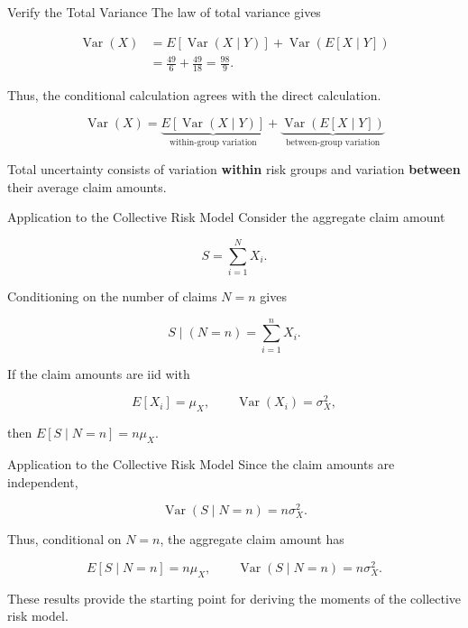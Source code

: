 \documentclass[
  ignorenonframetext,
  aspectratio=169,
]{beamer}
\begin{document}
\begin{frame}{Verify the Total Variance}
\protect{}\label{verify-the-total-variance}
The law of total variance gives

\[
\begin{aligned}
\operatorname{Var}(X)
&=E[\operatorname{Var}(X\mid Y)]
+\operatorname{Var}(E[X\mid Y])\\
&=\frac{49}{6}+\frac{49}{18}=\frac{98}{9}.
\end{aligned}
\]

Thus, the conditional calculation agrees with the direct calculation.

\begin{tcolorbox}[enhanced jigsaw, arc=.35mm, bottomrule=.15mm, bottomtitle=1mm, breakable, colback=white, colbacktitle=quarto-callout-note-color!10!white, colframe=quarto-callout-note-color-frame, coltitle=black, left=2mm, leftrule=.75mm, opacityback=0, opacitybacktitle=0.6, rightrule=.15mm, title=\textcolor{quarto-callout-note-color}{\faInfo}\hspace{0.5em}{Interpretation}, titlerule=0mm, toprule=.15mm, toptitle=1mm]

\[
\boxed{
\operatorname{Var}(X)
=
\underbrace{E[\operatorname{Var}(X\mid Y)]}_{\text{within-group variation}}
+
\underbrace{\operatorname{Var}(E[X\mid Y])}_{\text{between-group variation}}
}
\]

Total uncertainty consists of variation \textbf{within} risk groups and
variation \textbf{between} their average claim amounts.

\end{tcolorbox}
\end{frame}

\begin{frame}{Application to the Collective Risk Model}
\protect{}\label{application-to-the-collective-risk-model}
Consider the aggregate claim amount

\[
S=\sum_{i=1}^{N}X_i.
\]

Conditioning on the number of claims \(N=n\) gives

\[
S\mid(N=n)=\sum_{i=1}^{n}X_i.
\]

If the claim amounts are iid with

\[
E[X_i]=\mu_X,
\qquad
\operatorname{Var}(X_i)=\sigma_X^2,
\]

then \(\boxed{E[S\mid N=n]=n\mu_X}.\)
\end{frame}

\begin{frame}{Application to the Collective Risk Model}
\protect{}\label{application-to-the-collective-risk-model-1}
Since the claim amounts are independent,

\[
\boxed{\operatorname{Var}(S\mid N=n)=n\sigma_X^2}.
\]

Thus, conditional on \(N=n\), the aggregate claim amount has

\[
E[S\mid N=n]=n\mu_X,
\qquad
\operatorname{Var}(S\mid N=n)=n\sigma_X^2.
\]

These results provide the starting point for deriving the moments of the
collective risk model.
\end{frame}
\end{document}
